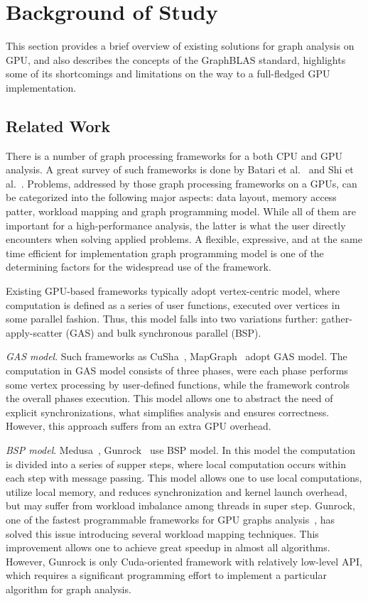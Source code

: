 \section{Background of Study}

This section provides a brief overview of existing solutions for graph analysis on GPU, and also describes the concepts of the GraphBLAS standard, highlights some of its shortcomings and limitations on the way to a full-fledged GPU implementation.

\subsection{Related Work}

There is a number of graph processing frameworks for a both CPU and GPU analysis. A great survey of such frameworks is done by Batari et al.~\cite{article:batarfi_survey_graphs} and Shi et al.~\cite{article:shi_survey_graphs}. Problems, addressed by those graph processing frameworks on a GPUs, can be categorized into the following major aspects: data layout, memory access patter, workload mapping and graph programming model. While all of them are important for a high-performance analysis, the latter is what the user directly encounters when solving applied problems. A flexible, expressive, and at the same time efficient for implementation graph programming model is one of the determining factors for the widespread use of the framework.

Existing GPU-based frameworks typically adopt vertex-centric model, where computation is defined as a series of user functions, executed over vertices in some parallel fashion. Thus, this model falls into two variations further: gather-apply-scatter (GAS) and bulk synchronous parallel (BSP). 

\textit{GAS model}. Such frameworks as CuSha~\cite{10.1145/2600212.2600227}, MapGraph~\cite{10.1145/2621934.2621936/MapGraph} adopt GAS model. The computation in GAS model consists of three phases, were each phase performs some vertex processing by user-defined functions, while the framework controls the overall phases execution. This model allows one to abstract the need of explicit synchronizations, what simplifies analysis and ensures correctness. However, this approach suffers from an extra GPU overhead.

\textit{BSP model}. Medusa~\cite{6497047/Medusa}, Gunrock~\cite{7967137} use BSP model. In this model the computation is divided into a series of supper steps, where local computation occurs within each step with message passing. This model allows one to use local computations, utilize local memory, and reduces synchronization and kernel launch overhead, but may suffer from workload imbalance among threads in super step. Gunrock, one of the fastest programmable frameworks for GPU graphs analysis~\cite{article:shi_survey_graphs},  has solved this issue introducing several workload mapping techniques. This improvement allows one to achieve great speedup in almost all algorithms. However, Gunrock is only Cuda-oriented framework with relatively low-level API, which requires a significant programming effort to implement a particular algorithm for graph analysis.

